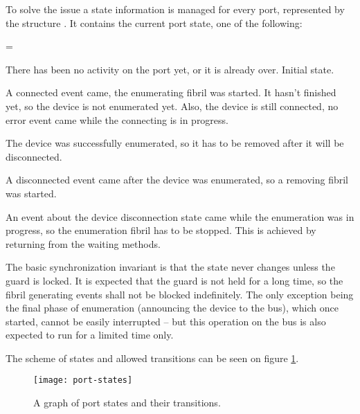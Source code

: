 To solve the issue a state information is managed for every port, represented
by the structure . It contains the current port state, one
of the following:

\begin{description}
\begingroup \leftskip=1cm \rightskip=\leftskip
\setcounter{enumi}{-1}
	\item[\state{Disabled}]
		There has been no activity on the port yet, or it is already over.
		Initial state.

	\item[\state{Connecting}]
		A connected event came, the enumerating fibril was started. It hasn't
		finished yet, so the device is not enumerated yet. Also, the device is
		still connected, no error event came while the connecting is in
		progress.

	\item[\state{Enumerated}]
		The device was successfully enumerated, so it has to be removed after
		it will be disconnected.

	\item[\state{Disconnecting}]
		A disconnected event came after the device was enumerated, so
		a removing fibril was started.

	\item[\state{Error}]
		An event about the device disconnection state came while the
		enumeration was in progress, so the enumeration fibril has to be
		stopped. This is achieved by returning  from the waiting
		methods.

\endgroup
\end{description}

The basic synchronization invariant is that the state never changes unless the
guard is locked. It is expected that the guard is not held for a long time, so
the fibril generating events shall not be blocked indefinitely. The only
exception being the final phase of enumeration (announcing the device to the
bus), which once started, cannot be easily interrupted -- but this operation on
the bus is also expected to run for a limited time only.

The scheme of states and allowed transitions can be seen on figure
\ref{fig:port-states}.

\begin{figure}[h]
	\centering
	\texttt{[image: port-states]}
	\caption{A graph of port states and their transitions.}
	\label{fig:port-states}
\end{figure}

